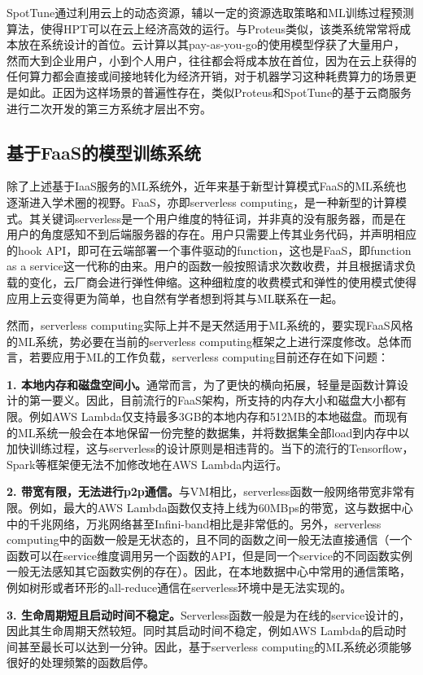 SpotTune通过利用云上的动态资源，辅以一定的资源选取策略和ML训练过程预测算法，使得HPT可以在云上经济高效的运行。与Proteus类似，该类系统常常将成本放在系统设计的首位。云计算以其pay-as-you-go的使用模型俘获了大量用户，然而大到企业用户，小到个人用户，往往都会将成本放在首位，因为在云上获得的任何算力都会直接或间接地转化为经济开销，对于机器学习这种耗费算力的场景更是如此。正因为这样场景的普遍性存在，类似Proteus和SpotTune的基于云商服务进行二次开发的第三方系统才层出不穷。

\subsection{基于FaaS的模型训练系统}
除了上述基于IaaS服务的ML系统外，近年来基于新型计算模式FaaS的ML系统也逐渐进入学术圈的视野。FaaS，亦即serverless computing，是一种新型的计算模式。其关键词serverless是一个用户维度的特征词，并非真的没有服务器，而是在用户的角度感知不到后端服务器的存在。用户只需要上传其业务代码，并声明相应的hook API，即可在云端部署一个事件驱动的function，这也是FaaS，即function as a service这一代称的由来。用户的函数一般按照请求次数收费，并且根据请求负载的变化，云厂商会进行弹性伸缩。这种细粒度的收费模式和弹性的使用模式使得应用上云变得更为简单，也自然有学者想到将其与ML联系在一起。

然而，serverless computing实际上并不是天然适用于ML系统的，要实现FaaS风格的ML系统，势必要在当前的serverless computing框架之上进行深度修改。总体而言，若要应用于ML的工作负载，serverless computing目前还存在如下问题：

\textbf{1. 本地内存和磁盘空间小。}通常而言，为了更快的横向拓展，轻量是函数计算设计的第一要义。因此，目前流行的FaaS架构，所支持的内存大小和磁盘大小都有限。例如AWS Lambda仅支持最多3GB的本地内存和512MB的本地磁盘。而现有的ML系统一般会在本地保留一份完整的数据集，并将数据集全部load到内存中以加快训练过程，这与serverless的设计原则是相违背的。当下的流行的Tensorflow，Spark等框架便无法不加修改地在AWS Lambda内运行。

\textbf{2. 带宽有限，无法进行p2p通信。}与VM相比，serverless函数一般网络带宽非常有限。例如，最大的AWS Lambda函数仅支持上线为60MBps的带宽，这与数据中心中的千兆网络，万兆网络甚至Infini-band相比是非常低的。另外，serverless computing中的函数一般是无状态的，且不同的函数之间一般无法直接通信（一个函数可以在service维度调用另一个函数的API，但是同一个service的不同函数实例一般无法感知其它函数实例的存在）。因此，在本地数据中心中常用的通信策略，例如树形或者环形的all-reduce通信在serverless环境中是无法实现的。

\textbf{3. 生命周期短且启动时间不稳定。}Serverless函数一般是为在线的service设计的，因此其生命周期天然较短。同时其启动时间不稳定，例如AWS Lambda的启动时间甚至最长可以达到一分钟。因此，基于serverless computing的ML系统必须能够很好的处理频繁的函数启停。


